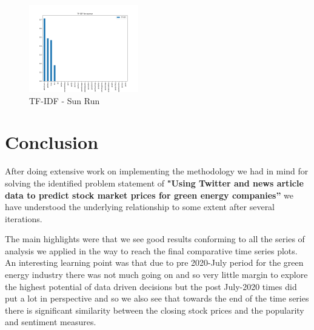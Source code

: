 \documentclass[sigconf, nonacm]{acmart}
\begin{document}
\begin{figure}[H]
  \centering
  \includegraphics[width=\linewidth, height =1.5in]{sunruntfidf.png}
  \caption{TF-IDF - Sun Run}
\end{figure}




\section{Conclusion}
After doing extensive work on implementing the methodology we had in mind for solving the identified problem statement of \textbf{"Using Twitter and news article data to predict stock market prices for green energy companies”} we have understood the underlying relationship to some extent after several iterations. \newline

The main highlights were that we see good results conforming to all the series of analysis we applied in the way to reach the final comparative time series plots. An interesting learning point was that due to pre 2020-July period for the green energy industry there was not much going on and so very little margin to explore the highest potential of data driven decisions but the post July-2020 times did put a lot in perspective and so we also see that towards the end of the time series there is significant similarity between the closing stock prices and the popularity and sentiment measures. \newline 
\end{document}
